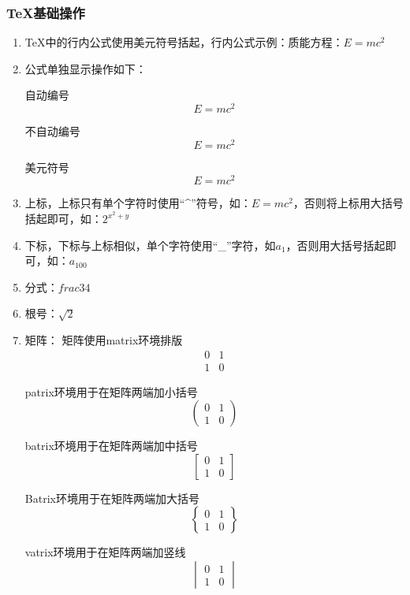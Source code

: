 \subsubsection{TeX{}基础操作}
\begin{enumerate}
	\item TeX{}中的行内公式使用美元符号括起，行内公式示例：质能方程：$E=mc^2$
	\item 公式单独显示操作如下：
	
	
	自动编号
	\begin{equation}
		E=mc^2
	\end{equation}
	
	
	不自动编号
	\begin{equation*}
		E=mc^2
	\end{equation*}
	
	
	
	美元符号
	$$E=mc^2$$
	\item 上标，上标只有单个字符时使用“\^{}”符号，如：$E=mc^2$，否则将上标用大括号括起即可，如：$2^{x^{2}+y}$
	\item 下标，下标与上标相似，单个字符使用“\_{}”字符，如$a_1$，否则用大括号括起即可，如：$a_{100}$
	\item 分式：$frac{3}{4}$
	\item 根号：$\sqrt{2}$
	\item 矩阵： 矩阵使用matrix环境排版
	$$\begin{matrix}
		0 & 1 \\
		1 & 0
	\end{matrix}$$
	
	
	patrix环境用于在矩阵两端加小括号
	$$\begin{pmatrix}
		0 & 1 \\
		1 & 0
	\end{pmatrix}$$
	
	
	batrix环境用于在矩阵两端加中括号
	\begin{equation*}
		\begin{bmatrix}
			0 & 1 \\
			1 & 0
		\end{bmatrix}
	\end{equation*}
	
	Batrix环境用于在矩阵两端加大括号
	\begin{equation*}
		\begin{Bmatrix}
			0 & 1 \\
			1 & 0
		\end{Bmatrix}
	\end{equation*}
	
	vatrix环境用于在矩阵两端加竖线
	\begin{equation*}
		\begin{vmatrix}
			0 & 1 \\
			1 & 0
		\end{vmatrix}
	\end{equation*}
	

\end{enumerate}
